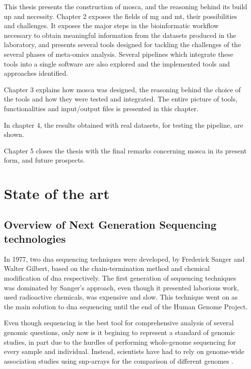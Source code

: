 \documentclass[
  oneside,
  11pt, a4paper,
  footinclude=true,
  headinclude=true,
  cleardoublepage=empty
]{scrbook}
\begin{document}
    This thesis presents the construction of \gls{mosca}, and the reasoning behind its build up and necessity. Chapter 2 exposes the fields of \gls{mg} and \gls{mt}, their possibilities and challenges. It exposes the major steps in the bioinformatic workflow necessary to obtain meaningful information from the datasets produced in the laboratory, and presents several tools designed for tackling the challenges of the several phases of meta-omics analysis. Several pipelines which integrate these tools into a single software are also explored and the implemented tools and approaches identified.
    
    Chapter 3 explains how \gls{mosca} was designed, the reasoning behind the choice of the tools and how they were tested and integrated. The entire picture of tools, functionalities and input/output files is presented in this chapter.
    
    In chapter 4, the results obtained with real datasets, for testing the pipeline, are shown.
    
    Chapter 5 closes the thesis with the final remarks concerning \gls{mosca} in its present form, and future prospects. 

	\chapter{State of the art}
    
	\section{Overview of Next Generation Sequencing technologies}
	
	In 1977, two \gls{dna} sequencing techniques were developed, by Frederick Sanger and Walter Gilbert, based on the chain-termination method and chemical modification of \gls{dna} respectively. The first generation of sequencing techniques was dominated by Sanger's approach, even though it presented laborious work, used radioactive chemicals, was expensive and slow. This technique went on as the main solution to \gls{dna} sequencing until the end of the Human Genome Project. 
	
	Even though sequencing is the best tool for comprehensive analysis of several genomic questions, only now is it begining to represent a standard of genomic studies, in part due to the hurdles of performing whole-genome sequencing for every sample and individual. Instead, scientists have had to rely on genome-wide association studies using \gls{snp}-arrays for the comparison of different genomes \citep{Buermans2014}. 
	
\end{document}
